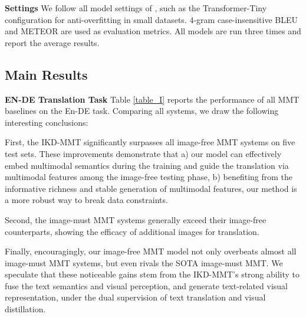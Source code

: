 \documentclass[11pt]{article}
\begin{document}
\textbf{Settings}
We follow all model settings of \cite{wu2021good}, such as the Transformer-Tiny configuration for anti-overfitting in small datasets.
4-gram case-insensitive BLEU \cite{papineni2002bleu} and METEOR \cite{denkowski-lavie-2014-meteor} are used as evaluation metrics.
All models are run three times and report the average results.

\subsection{Main Results}
\quad \textbf{EN-DE Translation Task}
Table \ref{table_I} reports the performance of all MMT baselines on the En-DE task. Comparing all systems, we draw the following interesting conclusions:

First, the IKD-MMT significantly surpasses all image-free MMT systems on five test sets.
These improvements demonstrate that
a) our model can effectively embed multimodal semantics during the training and guide the translation via multimodal features among the image-free testing phase,
b) benefiting from the informative richness and stable generation of multimodal features, our method is a more robust way to break data constraints.

Second, the image-must MMT systems generally exceed their image-free counterparts, showing the efficacy of additional images for translation.

Finally, encouragingly, our image-free MMT model not only overbeats almost all image-must MMT systems, but even rivals the SOTA image-must MMT.
We speculate that these noticeable gains stem from the IKD-MMT's strong ability to fuse the text semantics and visual perception, and generate text-related visual representation, under the dual supervision of text translation and visual distillation.
\end{document}
